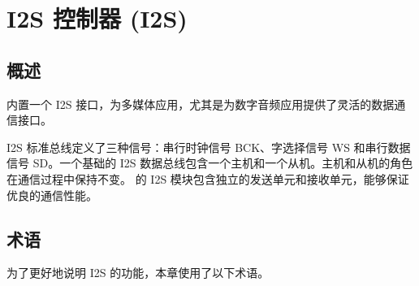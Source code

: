 \documentclass[main\_\_CN.tex]{subfiles}
\begin{document}

\ifglobal
\else
    {\let\clearpage\relax \listoftodos}
    {\let\clearpage\relax \listofdonetodos}
    \tableofcontents
\fi




\hypertarget{i2s}{}
\chapter{I2S 控制器 (I2S)}
\label{mod:i2s}


\section{概述}
\chipname{} 内置一个 I2S 接口，为多媒体应用，尤其是为数字音频应用提供了灵活的数据通信接口。

I2S 标准总线定义了三种信号：串行时钟信号 BCK、字选择信号 WS 和串行数据信号 SD。一个基础的 I2S 数据总线包含一个主机和一个从机。主机和从机的角色在通信过程中保持不变。\chipname{} 的 I2S 模块包含独立的发送单元和接收单元，能够保证优良的通信性能。

\section{术语}

为了更好地说明 I2S 的功能，本章使用了以下术语。 
\end{document}
